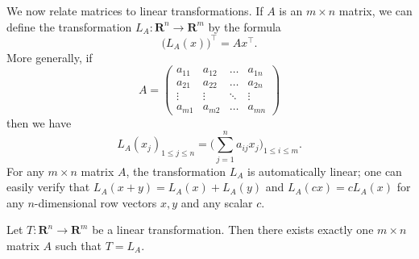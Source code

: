\begin{note}
    We now relate matrices to linear transformations.
    If \(A\) is an \(m \times n\) matrix, we can define the transformation \(L_A : \mathbf{R}^n \to \mathbf{R}^m\) by the formula
    \[
        \big(L_A(x)\big)^\top = Ax^\top.
    \]
    More generally, if
    \[
        A = \begin{pmatrix}
            a_{11} & a_{12} & \dots  & a_{1n} \\
            a_{21} & a_{22} & \dots  & a_{2n} \\
            \vdots & \vdots & \ddots & \vdots \\
            a_{m1} & a_{m2} & \dots  & a_{mn}
        \end{pmatrix}
    \]
    then we have
    \[
        L_A(x_j)_{1 \leq j \leq n} = \bigg(\sum_{j = 1}^n a_{ij} x_j\bigg)_{1 \leq i \leq m}.
    \]
    For any \(m \times n\) matrix \(A\), the transformation \(L_A\) is automatically linear;
    one can easily verify that \(L_A(x + y) = L_A(x) + L_A(y)\) and \(L_A(cx) = c L_A(x)\) for any \(n\)-dimensional row vectors \(x, y\) and any scalar \(c\).
\end{note}

\setcounter{theorem}{12}
\begin{lemma}\label{6.1.13}
    Let \(T : \mathbf{R}^n \to \mathbf{R}^m\) be a linear transformation.
    Then there exists exactly one \(m \times n\) matrix \(A\) such that \(T = L_A\).
\end{lemma}

